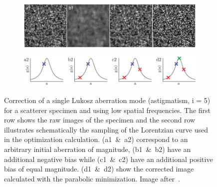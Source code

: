 \begin{figure}[tbh]
			\centering
			\begin{subfigure}[b]{0.7\textwidth}
							\includegraphics[width=\textwidth]{images/wide_parabolic_opti_images}
							\label{fig:para_opt_images}
			\end{subfigure}
			\begin{subfigure}[b]{0.7\textwidth}
							\includegraphics[width=\textwidth]{images/wide_parabolic_opti_graphs}
							\label{fig:para_opt_graphs}
			\end{subfigure}								
			\caption{Correction of a single Lukosz aberration mode (astigmatism, i = 5) for a scatterer specimen and using low spatial frequencies. The first row shows the raw images of the specimen and the second row illustrates schematically the sampling of the Lorentzian curve used in the optimization calculation. (a1~\&~a2) correspond to an arbitrary initial aberration of magnitude, (b1~\&~b2) have an additional negative bias while (c1~\&~c2) have an additional positive bias of equal magnitude. (d1~\&~d2) show the corrected image calculated with the parabolic minimization. Image after~\cite{wide_AOM_loew_freq}.}
	\label{fig:para_opt}
\end{figure} 

